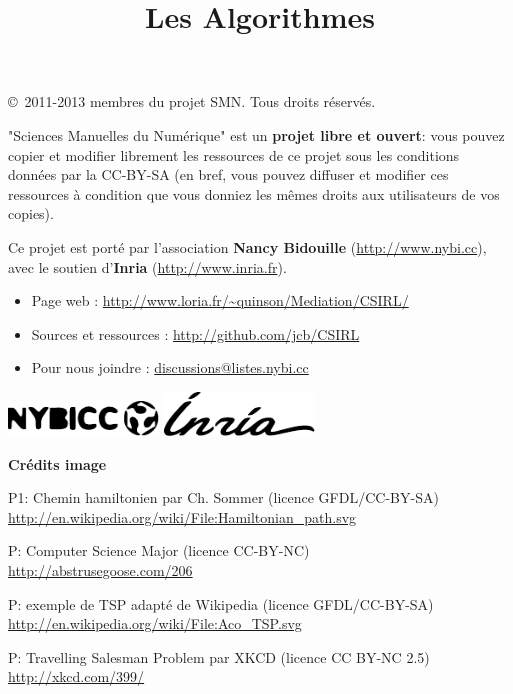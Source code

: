 \documentclass[a5paper,pagesize,DIV=14]{scrbook}
\title{Les Algorithmes}
\date{}
\begin{document}



\copyright\ 2011-2013 membres du projet SMN. Tous droits réservés.
  
"Sciences Manuelles du Numérique" est un \textbf{projet libre et ouvert}: vous
pouvez copier et modifier librement les ressources de ce projet sous les
conditions données par la CC-BY-SA (en bref, vous pouvez diffuser et modifier
ces ressources à condition que vous donniez les mêmes droits aux utilisateurs de
vos copies).

\bigskip

Ce projet est porté par l'association \textbf{Nancy Bidouille}
(\url{http://www.nybi.cc}), avec le soutien d'\textbf{Inria}
(\url{http://www.inria.fr}).
  
\bigskip

\begin{itemize}
\item Page web : \url{http://www.loria.fr/~quinson/Mediation/CSIRL/}
\item Sources et ressources : \url{http://github.com/jcb/CSIRL}
\item Pour nous joindre : \url{discussions@listes.nybi.cc}
\end{itemize}

\bigskip
\includegraphics[width=0.3\textwidth]{img/logo_nybicc.pdf}%
\includegraphics[width=0.3\textwidth]{img/logo_inria.pdf}

\vfill
\textbf{Crédits image}

{\footnotesize

P1: Chemin hamiltonien par Ch. Sommer (licence GFDL/CC-BY-SA)\\
\url{http://en.wikipedia.org/wiki/File:Hamiltonian_path.svg}

P\pageref{img:CSmajor}: Computer Science Major (licence CC-BY-NC)\\
\url{http://abstrusegoose.com/206}


P\pageref{img:tsp}: exemple de TSP adapté de Wikipedia (licence GFDL/CC-BY-SA)\\
\url{http://en.wikipedia.org/wiki/File:Aco_TSP.svg}
  
P\pageref{img:tsp_xkcd}: Travelling Salesman Problem par XKCD (licence CC BY-NC 2.5)\\
\url{http://xkcd.com/399/}
}
\end{document}
